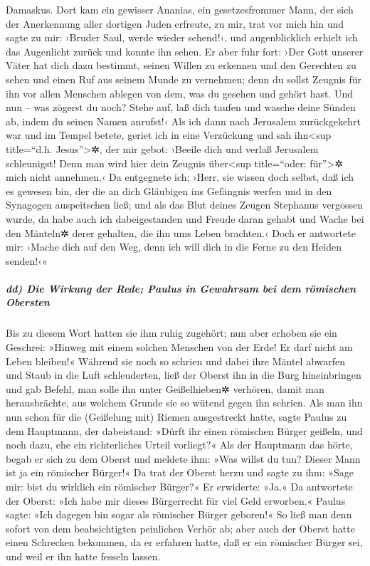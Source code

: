 Damaskus.  Dort kam ein gewisser Ananias, ein
gesetzesfrommer Mann, der sich der Anerkennung aller dortigen Juden
erfreute,  zu mir, trat vor mich hin und sagte zu mir:
›Bruder Saul, werde wieder sehend!‹, und augenblicklich erhielt ich das
Augenlicht zurück und konnte ihn sehen.  Er aber fuhr
fort: ›Der Gott unserer Väter hat dich dazu bestimmt, seinen Willen zu
erkennen und den Gerechten zu sehen und einen Ruf aus seinem Munde zu
vernehmen;  denn du sollst Zeugnis für ihn vor allen
Menschen ablegen von dem, was du gesehen und gehört hast.
 Und nun -- was zögerst du noch? Stehe auf, laß dich
taufen und wasche deine Sünden ab, indem du seinen Namen anrufst!‹
 Als ich dann nach Jerusalem zurückgekehrt war und im
Tempel betete, geriet ich in eine Verzückung  und sah
ihn\textless sup title=``d.h. Jesus''\textgreater✲, der mir gebot:
›Beeile dich und verlaß Jerusalem schleunigst! Denn man wird hier dein
Zeugnis über\textless sup title=``oder: für''\textgreater✲ mich nicht
annehmen.‹  Da entgegnete ich: ›Herr, sie wissen doch
selbst, daß ich es gewesen bin, der die an dich Gläubigen ins Gefängnis
werfen und in den Synagogen auspeitschen ließ;  und als
das Blut deines Zeugen Stephanus vergossen wurde, da habe auch ich
dabeigestanden und Freude daran gehabt und Wache bei den Mänteln✲ derer
gehalten, die ihn ums Leben brachten.‹  Doch er
antwortete mir: ›Mache dich auf den Weg, denn ich will dich in die Ferne
zu den Heiden senden!‹«

\hypertarget{dd-die-wirkung-der-rede-paulus-in-gewahrsam-bei-dem-ruxf6mischen-obersten}{%
\subparagraph{dd) Die Wirkung der Rede; Paulus in Gewahrsam bei dem
römischen
Obersten}\label{dd-die-wirkung-der-rede-paulus-in-gewahrsam-bei-dem-ruxf6mischen-obersten}}

 Bis zu diesem Wort hatten sie ihm ruhig zugehört; nun
aber erhoben sie ein Geschrei: »Hinweg mit einem solchen Menschen von
der Erde! Er darf nicht am Leben bleiben!«  Während sie
noch so schrien und dabei ihre Mäntel abwarfen und Staub in die Luft
schleuderten,  ließ der Oberst ihn in die Burg
hineinbringen und gab Befehl, man solle ihn unter Geißelhieben✲
verhören, damit man herausbrächte, aus welchem Grunde sie so wütend
gegen ihn schrien.  Als man ihn nun schon für die
(Geißelung mit) Riemen ausgestreckt hatte, sagte Paulus zu dem
Hauptmann, der dabeistand: »Dürft ihr einen römischen Bürger geißeln,
und noch dazu, ehe ein richterliches Urteil vorliegt?« 
Als der Hauptmann das hörte, begab er sich zu dem Oberst und meldete
ihm: »Was willst du tun? Dieser Mann ist ja ein römischer Bürger!«
 Da trat der Oberst herzu und sagte zu ihm: »Sage mir:
bist du wirklich ein römischer Bürger?« Er erwiderte: »Ja.«
 Da antwortete der Oberst: »Ich habe mir dieses
Bürgerrecht für viel Geld erworben.« Paulus sagte: »Ich dagegen bin
sogar als römischer Bürger geboren!«  So ließ man denn
sofort von dem beabsichtigten peinlichen Verhör ab; aber auch der Oberst
hatte einen Schrecken bekommen, da er erfahren hatte, daß er ein
römischer Bürger sei, und weil er ihn hatte fesseln lassen.

